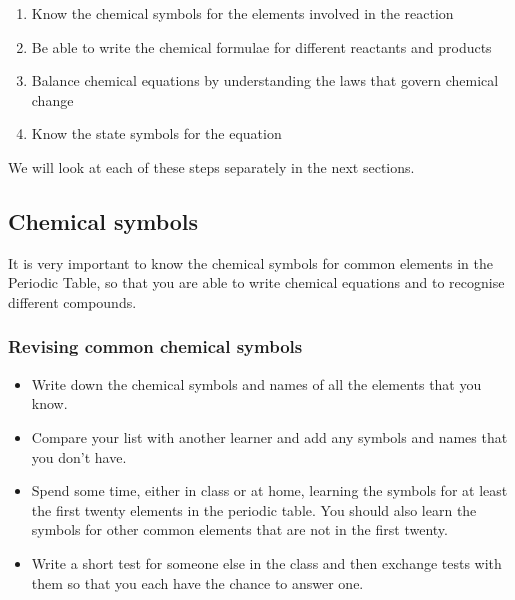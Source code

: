       \label{m38721*id62681}\begin{enumerate}[noitemsep, label=\textbf{\arabic*}. ] 
            \label{m38721*uid1}\item Know the chemical symbols for the elements involved in the reaction
\label{m38721*uid2}\item Be able to write the chemical formulae for different reactants and products
\label{m38721*uid3}\item Balance chemical equations by understanding the laws that govern chemical change
\label{m38721*uid4}\item Know the state symbols for the equation
\end{enumerate}
        
      \label{m38721*id62733}We will look at each of these steps separately in the next sections.\par 
    
    \label{m38721*cid2}
            \subsection{ Chemical symbols}
            \nopagebreak
            
      
      \label{m38721*id62746}It is very important to know the chemical symbols for common elements in the Periodic Table, so that you are able to write chemical equations and to recognise different compounds.\par 
\label{m38721*secfhsst!!!underscore!!!id109}
            \subsubsection{  Revising common chemical symbols
      }
            \nopagebreak
            
      \label{m38721*id62763}\begin{itemize}[noitemsep]
            \label{m38721*uid5}\item Write down the chemical symbols and names of all the elements that you know.
\label{m38721*uid6}\item Compare your list with another learner and add any symbols and names that you don't have.
\label{m38721*uid7}\item Spend some time, either in class or at home, learning the symbols for at least the first twenty elements in the periodic table. You should also learn the symbols for other common elements that are not in the first twenty.
\label{m38721*uid8}\item Write a short test for someone else in the class and then exchange tests with them so that you each have the chance to answer one.
\end{itemize}
        
